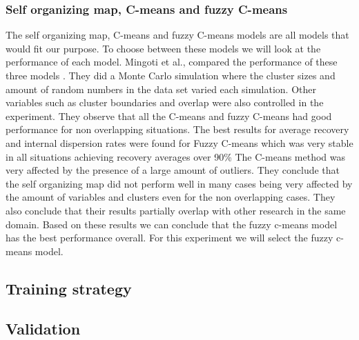 \documentclass[../../main]{subfiles}
\begin{document}
\subsubsection{Self organizing map, C-means and fuzzy C-means}
The self organizing map, C-means and fuzzy C-means models are all models that would fit our purpose. 
To choose between these models we will look at the performance of each model.
Mingoti et al., compared the performance of these three models \cite{Mingoti2006ComparingAlgorithms}.
They did a Monte Carlo simulation where the cluster sizes and amount of random numbers in the data set varied each simulation\cite{Mingoti2006ComparingAlgorithms}.
Other variables such as cluster boundaries and overlap were also controlled in the experiment.
They observe that all the C-means and fuzzy C-means had good performance for non overlapping situations\cite{Mingoti2006ComparingAlgorithms}.
The best results for average recovery and internal dispersion rates were found for Fuzzy C-means which was very stable in all situations achieving recovery averages over 90\%\cite{Mingoti2006ComparingAlgorithms}
The C-means method was very affected by the presence of a large amount of outliers.
They conclude that the self organizing map did not perform well in many cases being very affected by the amount of variables and clusters even for the non overlapping cases\cite{Mingoti2006ComparingAlgorithms}.
They also conclude that their results partially overlap with other research in the same domain.
\newline
Based on these results we can conclude that the fuzzy c-means model has the best performance overall.
For this experiment we will select the fuzzy c-means model.
\subsection{Training strategy}

\subsection{Validation}
\end{document}
